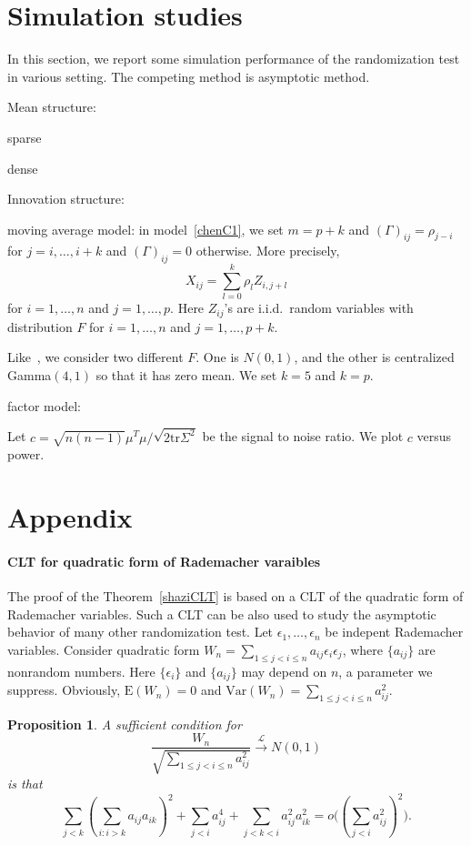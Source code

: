 \documentclass[review]{elsarticle}
\theoremstyle{plain}
\newtheorem{proposition}{\quad\quad Proposition}
\theoremstyle{definition}
\theoremstyle{remark}
\begin{document}
\section{Simulation studies}
In this section, we report some simulation performance of the randomization test in various setting.
The competing method is asymptotic method.

Mean structure:

sparse

dense


Innovation structure:

moving average model: in model~\eqref{chenC1}, we set $m=p+k$ and ${(\Gamma)}_{ij}=\rho_{j-i}$ for $j=i,\ldots, i+k$ and ${(\Gamma)}_{ij}=0$ otherwise. More precisely,
\begin{equation}
    X_{ij}=\sum_{l=0}^k \rho_{l}Z_{i,j+l}
\end{equation}
for $i=1,\ldots, n$ and $j=1,\ldots, p$. Here $Z_{ij}$'s are i.i.d.\ random variables with distribution $F$ for $i=1,\ldots, n$ and $j=1,\ldots, p+k$. 

Like~\cite{Chen2010A}, we consider two different $F$. One is $N(0,1)$, and the other is centralized Gamma$(4,1)$ so that it has zero mean. We set $k=5$ and $k=p$.

factor model:


Let $c=\sqrt{n(n-1)}\mu^T \mu /\sqrt{2\mathrm{tr}\Sigma^2}$ be the signal to noise ratio.
We plot $c$ versus power.

\section{Appendix}
\paragraph{CLT for quadratic form of Rademacher varaibles}
The proof of the Theorem~\ref{shaziCLT} is based on a CLT of the quadratic form of Rademacher variables. 
Such a CLT can be also used to study the asymptotic behavior of many other randomization test.
 Let $\epsilon_1,\ldots,\epsilon_n$ be indepent Rademacher  variables. 
 Consider quadratic form $W_n=\sum_{1\leq j<i\leq n} a_{ij}\epsilon_i \epsilon_j$, where $\{a_{ij}\}$ are nonrandom numbers. Here $\{\epsilon_i\}$ and $\{a_{ij}\}$ may depend on $n$, a parameter we suppress.
 Obviously, $\mathrm{E}(W_n)=0$ and $\mathrm{Var}(W_n)=\sum_{1\leq j<i\leq n} a_{ij}^2$.

 \begin{proposition}\label{CLTprop}
     A sufficient condition for
     \begin{equation}
         \frac{W_n}{\sqrt{\sum_{1\leq j<i\leq n} a_{ij}^2}}\xrightarrow{\mathcal{L}} N(0,1)
     \end{equation}
     is that
     \begin{equation}
         \sum_{j<k}{(\sum_{i:i>k}a_{ij}a_{ik})}^2+
         \sum_{j<i}a_{ij}^4+
         \sum_{j<k<i}a_{ij}^2 a_{ik}^2
         =o\big({(\sum_{j<i} a_{ij}^2)}^2\big).
     \end{equation}
 \end{proposition}
\end{document}
